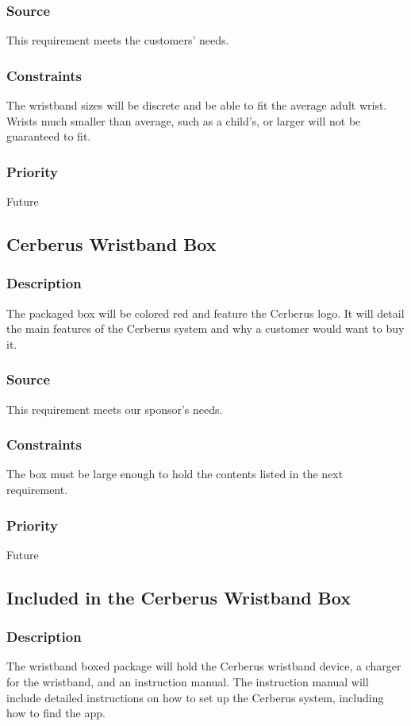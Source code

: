 \subsubsection{Source}
This requirement meets the customers' needs.
\subsubsection{Constraints}
The wristband sizes will be discrete and be able to fit the average adult wrist. Wrists much smaller than average, such as a child's, or larger will not be guaranteed to fit.
\subsubsection{Priority}
Future

\subsection{Cerberus Wristband Box}
\subsubsection{Description}
The packaged box will be colored red and feature the Cerberus logo. It will detail the main features of the Cerberus system and why a customer would want to buy it.
\subsubsection{Source}
This requirement meets our sponsor's needs.
\subsubsection{Constraints}
The box must be large enough to hold the contents listed in the next requirement.
\subsubsection{Priority}
Future

\subsection{Included in the Cerberus Wristband Box}
\subsubsection{Description}
The wristband boxed package will hold the Cerberus wristband device, a charger for the wristband, and an instruction manual. The instruction manual will include detailed instructions on how to set up the Cerberus system, including how to find the app.
